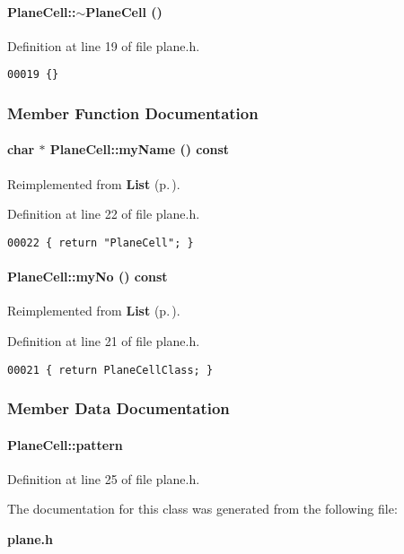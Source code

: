 \paragraph{\setlength{\rightskip}{0pt plus 5cm}Plane\-Cell::$\sim$Plane\-Cell ()\hspace{0.3cm}{\tt  [inline]}}\hfill



Definition at line 19 of file plane.h.\small\begin{verbatim}00019 {}
\end{verbatim}\normalsize 


\subsubsection{Member Function Documentation}
\label{PlaneCell_a3}
\paragraph{\setlength{\rightskip}{0pt plus 5cm}char $\ast$ Plane\-Cell::my\-Name () const\hspace{0.3cm}{\tt  [inline, virtual]}}\hfill



Reimplemented from {\bf List} {\rm (p.\,\pageref{List_a7})}.

Definition at line 22 of file plane.h.\small\begin{verbatim}00022 { return "PlaneCell"; }
\end{verbatim}\normalsize 
\label{PlaneCell_a2}
\paragraph{ Plane\-Cell::my\-No () const\hspace{0.3cm}{\tt  [inline, virtual]}}\hfill



Reimplemented from {\bf List} {\rm (p.\,\pageref{List_a6})}.

Definition at line 21 of file plane.h.\small\begin{verbatim}00021 { return PlaneCellClass; }
\end{verbatim}\normalsize 


\subsubsection{Member Data Documentation}
\label{PlaneCell_m0}
\paragraph{ Plane\-Cell::pattern}\hfill



Definition at line 25 of file plane.h.

The documentation for this class was generated from the following file:\begin{CompactItemize}
\item 
{\bf plane.h}\end{CompactItemize}

